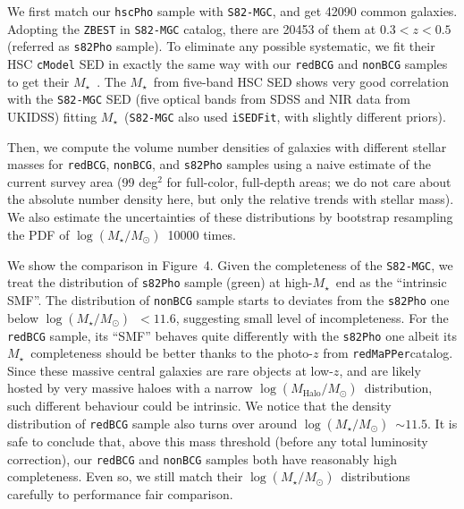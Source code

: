 \documentclass[preprint]{aastex}
\def\redm{\texttt{redMaPPer}}
\def\logms{{$\log (M_{\star}/M_{\odot})$}~}
\def\mstar{{$M_{\star}$}~}
\def\logmh{{$\log (M_{\mathrm{Halo}}/M_{\odot})$}~}
\begin{document}
\begin{CJK*}{UTF8}{gbsn}
    We first match our \texttt{hscPho} sample with \texttt{S82-MGC}, 
    and get 42090 common galaxies. 
    Adopting the \texttt{ZBEST} in \texttt{S82-MGC} catalog, there are 20453 
    of them at $0.3 < z < 0.5$ (referred as \texttt{s82Pho} sample).  
    To eliminate any possible systematic, we fit their HSC \texttt{cModel} SED 
    in exactly the same way with our \texttt{redBCG} and \texttt{nonBCG} samples 
    to get their \mstar. 
    The \mstar from five-band HSC SED shows very good correlation with the 
    \texttt{S82-MGC} SED (five optical bands from SDSS and NIR data from UKIDSS)
    fitting \mstar (\texttt{S82-MGC} also used \texttt{iSEDFit}, with slightly 
    different priors).  
    
    Then, we compute the volume number densities of galaxies with different stellar 
    masses for \texttt{redBCG}, \texttt{nonBCG}, and \texttt{s82Pho} samples using 
    a naive estimate of the current survey area (99 deg$^2$ for full-color, full-depth
    areas; we do not care about the absolute number density here, but only the 
    relative trends with stellar mass).  
    We also estimate the uncertainties of these distributions by bootstrap resampling 
    the PDF of \logms 10000 times. 
    
    We show the comparison in Figure~4.  
    Given the completeness of the \texttt{S82-MGC}, we treat the distribution of 
    \texttt{s82Pho} sample (green) at high-\mstar end as the ``intrinsic SMF''.
    The distribution of \texttt{nonBCG} sample starts to deviates from the 
    \texttt{s82Pho} one below \logms$< 11.6$, suggesting small level of incompleteness. 
    For the \texttt{redBCG} sample, its ``SMF'' behaves quite differently with the 
    \texttt{s82Pho} one albeit its \mstar completeness should be better thanks 
    to the photo-$z$ from \redm catalog.  
    Since these massive central galaxies are rare objects at low-$z$, and
    are likely hosted by very massive haloes with a narrow \logmh distribution, 
    such different behaviour could be intrinsic. 
    We notice that the density distribution of \texttt{redBCG} sample also turns 
    over around \logms$\sim 11.5$.  
    It is safe to conclude that, above this mass threshold (before any total luminosity 
    correction), our \texttt{redBCG} and \texttt{nonBCG} samples both have reasonably 
    high completeness.  
    Even so, we still match their \logms distributions carefully to performance 
    fair comparison. 
    


\end{CJK*}
\end{document}
